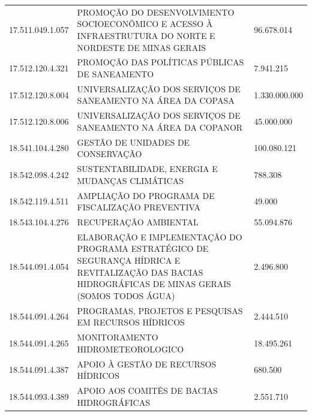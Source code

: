 \documentclass{article}
\begin{document}
\begin{longtable}[c]{m{3cm}|m{12cm}|m{2cm}}
\multicolumn{1}{C{3cm}|}{17.511.049.1.057} & \multicolumn{1}{L{12cm}|}{PROMOÇÃO DO DESENVOLVIMENTO SOCIOECONÔMICO E ACESSO À INFRAESTRUTURA DO NORTE E NORDESTE DE MINAS GERAIS} & \multicolumn{1}{R{2cm}}{96.678.014} \\
\multicolumn{1}{C{3cm}|}{17.512.120.4.321} & \multicolumn{1}{L{12cm}|}{PROMOÇÃO DAS POLÍTICAS PÚBLICAS DE SANEAMENTO} & \multicolumn{1}{R{2cm}}{7.941.215} \\
\multicolumn{1}{C{3cm}|}{17.512.120.8.004} & \multicolumn{1}{L{12cm}|}{UNIVERSALIZAÇÃO DOS SERVIÇOS DE SANEAMENTO NA ÁREA DA COPASA} & \multicolumn{1}{R{2cm}}{1.330.000.000} \\
\multicolumn{1}{C{3cm}|}{17.512.120.8.006} & \multicolumn{1}{L{12cm}|}{UNIVERSALIZAÇÃO DOS SERVIÇOS DE SANEAMENTO NA ÁREA DA COPANOR} & \multicolumn{1}{R{2cm}}{45.000.000} \\
\multicolumn{1}{C{3cm}|}{18.541.104.4.280} & \multicolumn{1}{L{12cm}|}{GESTÃO DE UNIDADES DE CONSERVAÇÃO} & \multicolumn{1}{R{2cm}}{100.080.121} \\
\multicolumn{1}{C{3cm}|}{18.542.098.4.242} & \multicolumn{1}{L{12cm}|}{SUSTENTABILIDADE, ENERGIA E MUDANÇAS CLIMÁTICAS} & \multicolumn{1}{R{2cm}}{788.308} \\
\multicolumn{1}{C{3cm}|}{18.542.119.4.511} & \multicolumn{1}{L{12cm}|}{AMPLIAÇÃO DO PROGRAMA DE FISCALIZAÇÃO PREVENTIVA} & \multicolumn{1}{R{2cm}}{49.000} \\
\multicolumn{1}{C{3cm}|}{18.543.104.4.276} & \multicolumn{1}{L{12cm}|}{RECUPERAÇÃO AMBIENTAL} & \multicolumn{1}{R{2cm}}{55.094.876} \\
\multicolumn{1}{C{3cm}|}{18.544.091.4.054} & \multicolumn{1}{L{12cm}|}{ELABORAÇÃO E IMPLEMENTAÇÃO DO PROGRAMA ESTRATÉGICO DE SEGURANÇA HÍDRICA E REVITALIZAÇÃO DAS BACIAS HIDROGRÁFICAS DE MINAS GERAIS (SOMOS TODOS ÁGUA)} & \multicolumn{1}{R{2cm}}{2.496.800} \\
\multicolumn{1}{C{3cm}|}{18.544.091.4.264} & \multicolumn{1}{L{12cm}|}{PROGRAMAS, PROJETOS E PESQUISAS EM RECURSOS HÍDRICOS} & \multicolumn{1}{R{2cm}}{2.444.510} \\
\multicolumn{1}{C{3cm}|}{18.544.091.4.265} & \multicolumn{1}{L{12cm}|}{MONITORAMENTO HIDROMETEOROLOGICO} & \multicolumn{1}{R{2cm}}{18.495.261} \\
\multicolumn{1}{C{3cm}|}{18.544.091.4.387} & \multicolumn{1}{L{12cm}|}{APOIO À GESTÃO DE RECURSOS HÍDRICOS} & \multicolumn{1}{R{2cm}}{680.500} \\
\multicolumn{1}{C{3cm}|}{18.544.093.4.389} & \multicolumn{1}{L{12cm}|}{APOIO AOS COMITÊS DE BACIAS HIDROGRÁFICAS} & \multicolumn{1}{R{2cm}}{2.551.710} \\

\end{longtable}
\end{document}
